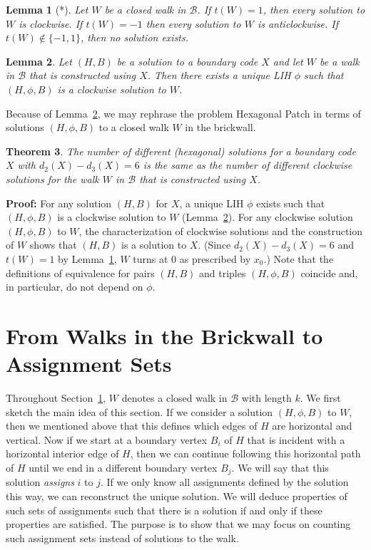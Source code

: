 \documentclass{llncs}
\newcommand{\PF}{{\bf Proof: }}
\newcommand{\QED}{\hspace*{\fill}{$\Box$}\medskip}
\newcommand{\BW}{\mathcal{B}}
\newtheorem{thm}{Theorem}
\newtheorem{lem}[thm]{Lemma}
\begin{document}
\begin{lem}[*]
\label{lem:cw_or_acw}
Let $W$ be a closed walk in $\BW$.
If $t(W)=1$, then every solution to $W$ is clockwise. If $t(W)=-1$ then every solution to $W$ is anticlockwise. If $t(W)\not\in \{-1,1\}$, then no solution exists.
\end{lem}


\begin{lem}
\label{lem:unique_phi}
Let $(H,B)$ be a solution to a boundary code $X$ and let $W$ be a walk in $\BW$ that is constructed using $X$. Then there exists a unique LIH $\phi$ such that $(H,\phi,B)$ is a clockwise solution to $W$.
\end{lem}

Because of Lemma~\ref{lem:unique_phi}, we may rephrase the problem Hexagonal Patch in terms of solutions $(H,\phi,B)$ to a closed walk $W$ in the brickwall. 

\begin{thm}
\label{thm:equiv_boundary_walk}
The number of different (hexagonal) solutions for a boundary code $X$ with $d_2(X)-d_3(X)=6$ is the same as the number of different clockwise solutions for the walk $W$ in $\BW$ that is constructed using $X$.
\end{thm}
\PF
For any solution $(H,B)$ for $X$, a unique LIH $\phi$ exists such that $(H,\phi,B)$ is a clockwise solution to $W$ (Lemma~\ref{lem:unique_phi}). For any clockwise solution $(H,\phi,B)$ to $W$, the characterization of clockwise solutions and the construction of $W$ shows that $(H,B)$ is a solution to $X$. 
(Since $d_2(X)-d_3(X)=6$ and $t(W)=1$ by Lemma~\ref{lem:cw_or_acw}, $W$ turns at $0$ as prescribed by $x_0$.)
Note that the definitions of equivalence for pairs $(H,B)$ and triples $(H,\phi,B)$ coincide and, in particular, do not depend on $\phi$.
\QED






\section{From Walks in the Brickwall to Assignment Sets}
\label{sec:assignments}



Throughout Section~\ref{sec:assignments}, $W$ denotes a closed walk in $\BW$ with length $k$.
We first sketch the main idea of this section.
If we consider a solution $(H,\phi,B)$ to $W$, then we mentioned above that this defines which edges of $H$ are horizontal and vertical. Now if we start at a boundary vertex $B_i$ of $H$ that is incident with a horizontal interior edge of $H$, then we can continue following this horizontal path of $H$ until we end in a different boundary vertex $B_j$. We will say that this solution {\em assigns} $i$ to $j$. If we only know all assignments defined by the solution this way, we can reconstruct the unique solution. We will deduce properties of such sets of assignments such that there is a solution if and only if these properties are satisfied. The purpose is to show that we may focus on counting such assignment sets instead of solutions to the walk.
\end{document}
